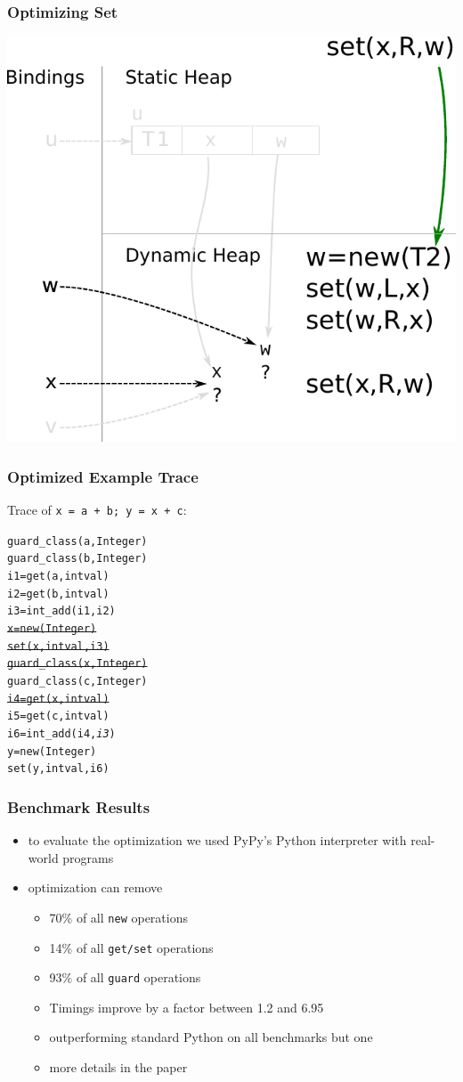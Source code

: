 \documentclass[utf8x]{beamer}
\begin{document}
\begin{frame}[plain]
  \frametitle{Optimizing Set}
  \includegraphics[scale=0.8]{figures/opt_set_dynamic2}
\end{frame}

\begin{frame}[containsverbatim]
  \frametitle{Optimized Example Trace}
  Trace of \texttt{x = a + b; y = x + c}:
\begin{alltt}
guard_class(a, Integer)
guard_class(b, Integer)
i1 = get(a, intval)
i2 = get(b, intval)
i3 = int_add(i1, i2)
\sout{x = new(Integer)}
\sout{set(x, intval, i3)}
\sout{guard_class(x, Integer)}
guard_class(c, Integer)
\sout{i4 = get(x, intval)}
i5 = get(c, intval)
i6 = int_add(i4, \emph{i3})
y = new(Integer)
set(y, intval, i6)
\end{alltt}
\end{frame}


\begin{frame}
  \frametitle{Benchmark Results}
  \begin{itemize}
      \item to evaluate the optimization we used PyPy's Python interpreter with real-world programs
      \item optimization can remove
      \begin{itemize}
          \item 70\% of all \texttt{new} operations
          \item 14\% of all \texttt{get/set} operations
          \item 93\% of all \texttt{guard} operations
      \pause
      \item Timings improve by a factor between 1.2 and 6.95
      \item outperforming standard Python on all benchmarks but one
      \pause
      \item more details in the paper
      \end{itemize}
  \end{itemize}
\end{frame}
\end{document}
